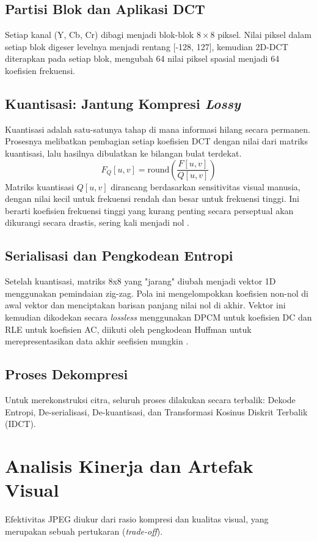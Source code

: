\documentclass[a4paper]{article}
\begin{document}
\subsection{Partisi Blok dan Aplikasi DCT}
Setiap kanal (Y, Cb, Cr) dibagi menjadi blok-blok $8 \times 8$ piksel. Nilai piksel dalam setiap blok digeser levelnya menjadi rentang [-128, 127], kemudian 2D-DCT diterapkan pada setiap blok, mengubah 64 nilai piksel spasial menjadi 64 koefisien frekuensi.

\subsection{Kuantisasi: Jantung Kompresi \textit{Lossy}}
Kuantisasi adalah satu-satunya tahap di mana informasi hilang secara permanen. Prosesnya melibatkan pembagian setiap koefisien DCT dengan nilai dari matriks kuantisasi, lalu hasilnya dibulatkan ke bilangan bulat terdekat.
\begin{equation} \label{eq:quantization}
  F_Q[u, v] = \text{round}\left(\frac{F[u, v]}{Q[u, v]}\right)
\end{equation}
Matriks kuantisasi $Q[u,v]$ dirancang berdasarkan sensitivitas visual manusia, dengan nilai kecil untuk frekuensi rendah dan besar untuk frekuensi tinggi. Ini berarti koefisien frekuensi tinggi yang kurang penting secara perseptual akan dikurangi secara drastis, sering kali menjadi nol \cite{wallace1991jpeg}.

\subsection{Serialisasi dan Pengkodean Entropi}
Setelah kuantisasi, matriks 8x8 yang "jarang" diubah menjadi vektor 1D menggunakan pemindaian zig-zag. Pola ini mengelompokkan koefisien non-nol di awal vektor dan menciptakan barisan panjang nilai nol di akhir. Vektor ini kemudian dikodekan secara \textit{lossless} menggunakan DPCM untuk koefisien DC dan RLE untuk koefisien AC, diikuti oleh pengkodean Huffman untuk merepresentasikan data akhir seefisien mungkin \cite{wallace1991jpeg}.

\subsection{Proses Dekompresi}
Untuk merekonstruksi citra, seluruh proses dilakukan secara terbalik: Dekode Entropi, De-serialisasi, De-kuantisasi, dan Transformasi Kosinus Diskrit Terbalik (IDCT).

\section{Analisis Kinerja dan Artefak Visual}
Efektivitas JPEG diukur dari rasio kompresi dan kualitas visual, yang merupakan sebuah pertukaran (\textit{trade-off}).
\end{document}
